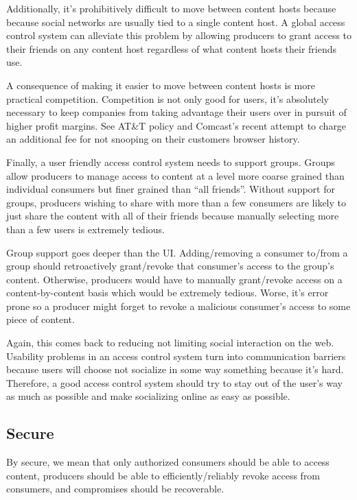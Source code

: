 \documentclass[pdftex,12pt,a4papaer,twoside,notitlepage]{report}
\begin{document}
Additionally, it's prohibitively difficult to move between content hosts because
because social networks are usually tied to a single content host. A global
access control system can alleviate this problem by allowing producers to
grant access to their friends on any content host regardless of what content
hosts their friends use.

A consequence of making it easier to move between content hosts is more
practical competition. Competition is not only good for users, it's absolutely
necessary to keep companies from taking advantage their users over in pursuit of
higher profit margins. See AT\&T\cite{att} policy and Comcast's\cite{comcast}
recent attempt to charge an additional fee for not snooping on their customers
browser history.

Finally, a user friendly access control system needs to support groups. Groups
allow producers to manage access to content at a level more coarse grained than
individual consumers but finer grained than ``all friends''. Without support for
groups, producers wishing to share with more than a few consumers are likely to
just share the content with all of their friends because manually selecting more
than a few users is extremely tedious.

Group support goes deeper than the UI. Adding/removing a consumer to/from a
group should retroactively grant/revoke that consumer's access to the group's
content. Otherwise, producers would have to manually grant/revoke access on a
content-by-content basis which would be extremely tedious. Worse, it's error
prone so a producer might forget to revoke a malicious consumer's access to some
piece of content.

Again, this comes back to reducing not limiting social interaction on the web.
Usability problems in an access control system turn into communication barriers
because users will choose not socialize in some way something because it's hard.
Therefore, a good access control system should try to stay out of the user's way
as much as possible and make socializing online as easy as possible.

\subsection{Secure}

By secure, we mean that only authorized consumers should be able to access
content, producers should be able to efficiently/reliably revoke access from
consumers, and compromises should be recoverable.
\end{document}

